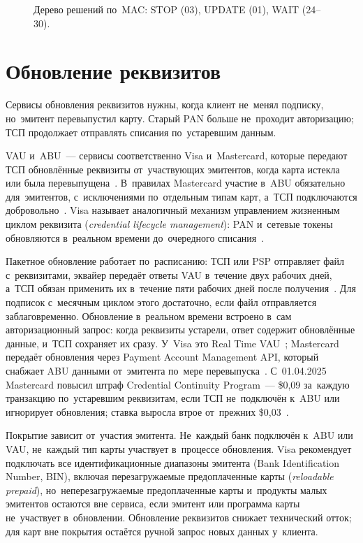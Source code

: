 \begin{figure}[htbp]
  \centering
  \caption{Дерево решений по~MAC: STOP (03), UPDATE (01), WAIT (24--30).}\label{fig:decline-decision-tree}
\end{figure}


\FloatBarrier
\section{Обновление реквизитов}\label{sec:subscriptions-account-updater}

Сервисы обновления реквизитов нужны, когда клиент не~менял подписку,
но~эмитент перевыпустил карту. Старый PAN больше не~проходит авторизацию; ТСП
продолжает отправлять списания по~устаревшим данным.

VAU и~ABU~--- сервисы соответственно Visa и~Mastercard, которые передают ТСП
обновлённые реквизиты от~участвующих эмитентов, когда карта истекла или была
перевыпущена~\cite{mc-abu-privacy,visa-vau}. В~правилах Mastercard участие
в~ABU обязательно для~эмитентов, с~исключениями по~отдельным типам карт,
а~ТСП подключаются добровольно~\cite{mc-tpr}. Visa называет аналогичный механизм управлением жизненным циклом реквизита
(\textit{credential lifecycle management}): PAN и~сетевые токены обновляются
в~реальном времени до~очередного списания~\cite{visa-lifecycle-management}.

Пакетное обновление работает по~расписанию: ТСП или PSP отправляет файл
с~реквизитами, эквайер передаёт ответы VAU в~течение двух рабочих дней,
а~ТСП обязан применить их в~течение пяти рабочих дней после
получения~\cite{visa-vau-faq}. Для подписок с~месячным циклом этого достаточно, если файл отправляется
заблаговременно. Обновление в~реальном времени встроено в~сам авторизационный
запрос: когда реквизиты устарели, ответ содержит обновлённые данные, и~ТСП
сохраняет их сразу. У~Visa это Real Time
VAU~\cite{visa-vau}; Mastercard передаёт обновления через
Payment Account Management API, который снабжает ABU данными от~эмитента
по~мере перевыпуска~\cite{mc-tpr}. С~01.04.2025 Mastercard повысил
штраф Credential Continuity Program~--- \$0,09 за~каждую транзакцию
по~устаревшим реквизитам, если ТСП не~подключён к~ABU или игнорирует
обновления; ставка выросла втрое от~прежних \$0,03~\cite{verisave-mc-rate-changes}.

Покрытие зависит от~участия эмитента. Не~каждый банк подключён к~ABU или VAU,
не~каждый тип карты участвует в~процессе обновления. Visa рекомендует подключать
все идентификационные диапазоны эмитента (Bank Identification Number, BIN),
включая перезагружаемые предоплаченные карты (\textit{reloadable prepaid}),
но~неперезагружаемые предоплаченные карты и~продукты малых эмитентов остаются
вне сервиса, если эмитент или программа карты не~участвует в~обновлении.
Обновление реквизитов снижает технический отток; для карт вне покрытия
остаётся ручной запрос новых данных у~клиента.

